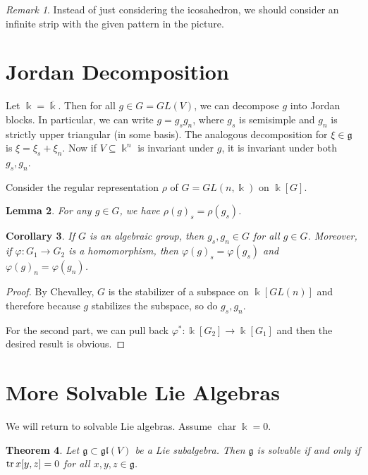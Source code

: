 \documentclass[leqno, openany]{memoir}
\newtheorem{thm}{Theorem}[section]
\newtheorem{cor}[thm]{Corollary}
\newtheorem{lem}[thm]{Lemma}
\theoremstyle{definition}
\theoremstyle{remark}
\newtheorem{rmk}[thm]{Remark}
\theoremstyle{plain}
\theoremstyle{definition}
\theoremstyle{remark}
\renewcommand{\k}{\Bbbk}
\newcommand{\mf}[1]{\mathfrak{#1}}
\newcommand{\ol}[1]{\overline{#1}}
\DeclareMathOperator{\chr}{char}
\begin{document}
\begin{rmk}
    Instead of just considering the icosahedron, we should consider an infinite strip with the given pattern in the picture.
\end{rmk}

\section{Jordan Decomposition}%
\label{sec:jordan_decomposition}

Let $\k = \ol{\k}$. Then for all $g \in G = GL(V)$, we can decompose $g$ into Jordan blocks. In particular, we can write $g = g_s g_n$, where $g_s$ is semisimple and $g_n$ is strictly upper triangular (in some basis). The analogous decomposition for $\xi \in \mf{g}$ is $\xi = \xi_s + \xi_n$. Now if $V \subseteq \k^n$ is invariant under $g$, it is invariant under both $g_s, g_n$.

Consider the regular representation $\rho$ of $G = GL(n, \k)$ on $\k[G]$.

\begin{lem}
    For any $g \in G$, we have ${\rho(g)}_s = \rho(g_s)$. 
\end{lem}

\begin{cor}
    If $G$ is an algebraic group, then $g_s, g_n \in G$ for all $g \in G$. Moreover, if $\varphi \colon G_1 \to G_2$ is a homomorphism, then ${ \varphi(g) }_s = \varphi(g_s)$ and ${\varphi(g)}_n = \varphi(g_n)$.
\end{cor}

\begin{proof}
    By Chevalley, $G$ is the stabilizer of a subspace on $\k[GL(n)]$ and therefore because $g$ stabilizes the subspace, so do $g_s, g_n$.

    For the second part, we can pull back $\varphi^* \colon \k[G_2] \to \k[G_1]$ and then the desired result is obvious.
\end{proof}

\section{More Solvable Lie Algebras}%
\label{sec:more_solvable_lie_algebras}

We will return to solvable Lie algebras. Assume $\chr \k = 0$.

\begin{thm}
    Let $\mf{g} \subset \mf{gl}(V)$ be a Lie subalgebra. Then $\mf{g}$ is solvable if and only if $\trace x[y,z] = 0$ for all $x,y,z \in \mf{g}$.
\end{thm}
\end{document}
